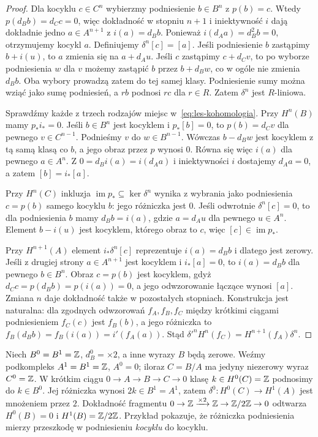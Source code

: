 \begin{proof}
Dla kocyklu $c\in C^n$ wybierzmy podniesienie
$b\in B^n$ z $p(b)=c$.
Wtedy $p(d_Bb)=d_Cc=0$, więc dokładność
w stopniu $n+1$ i iniektywność $i$
dają dokładnie jedno $a\in A^{n+1}$
z $i(a)=d_Bb$.
Ponieważ $i(d_Aa)=d_B^2b=0$,
otrzymujemy kocykl $a$.
Definiujemy $\delta^n[c]=[a]$.
Jeśli podniesienie $b$ zastąpimy $b+i(u)$,
to $a$ zmienia się na $a+d_Au$.
Jeśli $c$ zastąpimy $c+d_Cv$, to po
wyborze podniesienia $w$ dla $v$ możemy
zastąpić $b$ przez $b+d_Bw$,
co w ogóle nie zmienia $d_Bb$.
Oba wybory prowadzą zatem do tej
samej klasy. Podniesienie sumy można wziąć
jako sumę podniesień, a $rb$ podnosi $rc$ dla $r\in R$.
Zatem $\delta^n$ jest $R$-liniowa.

Sprawdźmy każde z trzech rodzajów miejsc
w~\eqref{eq:les-kohomologia}.
Przy $H^n(B)$ mamy $p_*i_*=0$.
Jeśli $b\in B^n$ jest kocyklem
i $p_*[b]=0$, to $p(b)=d_Cv$
dla pewnego $v\in C^{n-1}$.
Podnieśmy $v$ do $w\in B^{n-1}$.
Wówczas $b-d_Bw$ jest kocyklem
z tą samą klasą co $b$, a jego
obraz przez $p$ wynosi $0$.
Równa się więc $i(a)$ dla pewnego
$a\in A^n$. Z $0=d_Bi(a)=i(d_Aa)$
i iniektywności $i$ dostajemy
$d_Aa=0$, a zatem $[b]=i_*[a]$.

Przy $H^n(C)$ inkluzja
$\operatorname{im}p_*\subseteq\ker\delta^n$
wynika z wybrania jako podniesienia $c=p(b)$
samego kocyklu $b$: jego różniczka jest $0$.
Jeśli odwrotnie $\delta^n[c]=0$,
to dla podniesienia $b$ mamy $d_Bb=i(a)$,
gdzie $a=d_Au$ dla pewnego $u\in A^n$.
Element $b-i(u)$ jest kocyklem,
którego obraz to $c$, więc
$[c]\in\operatorname{im}p_*$.

Przy $H^{n+1}(A)$ element
$i_*\delta^n[c]$ reprezentuje
$i(a)=d_Bb$ i dlatego jest zerowy.
Jeśli z drugiej strony $a\in A^{n+1}$
jest kocyklem i $i_*[a]=0$,
to $i(a)=d_Bb$ dla pewnego
$b\in B^n$. Obraz $c=p(b)$ jest
kocyklem, gdyż $d_Cc=p(d_Bb)=p(i(a))=0$,
a jego odwzorowanie łączące wynosi $[a]$.
Zmiana $n$ daje dokładność także
w pozostałych stopniach. Konstrukcja jest naturalna:
dla zgodnych odwzorowań $f_A,f_B,f_C$ między krótkimi ciągami
podniesieniem $f_C(c)$ jest $f_B(b)$, a jego różniczka to
$f_B(d_Bb)=f_B(i(a))=i'(f_A(a))$.
Stąd $\delta'^n H^n(f_C)=H^{n+1}(f_A)\delta^n$.
\end{proof}

\begin{przyklad}
Niech $B^0=B^1=\mathbb{Z}$, $d_B^0=\times2$, a inne
wyrazy $B$ będą zerowe. Weźmy podkompleks
$A^1=B^1=\mathbb{Z}$, $A^0=0$; iloraz $C=B/A$
ma jedyny niezerowy wyraz $C^0=\mathbb{Z}$.
W krótkim ciągu $0\to A\to B\to C\to0$
klasę $k\in H^0(C)=\mathbb{Z}$ podnosimy do $k\in B^0$.
Jej różniczka wynosi $2k\in B^1=A^1$, zatem
$\delta^0:H^0(C)\to H^1(A)$ jest mnożeniem przez $2$.
Dokładność fragmentu
$0\to\mathbb{Z}\xrightarrow{\times2}\mathbb{Z}\to\mathbb{Z}/2\mathbb{Z}\to0$
odtwarza $H^0(B)=0$ i $H^1(B)=\mathbb{Z}/2\mathbb{Z}$.
Przykład pokazuje, że różniczka podniesienia mierzy
przeszkodę w podniesieniu \emph{kocyklu} do kocyklu.
\end{przyklad}

